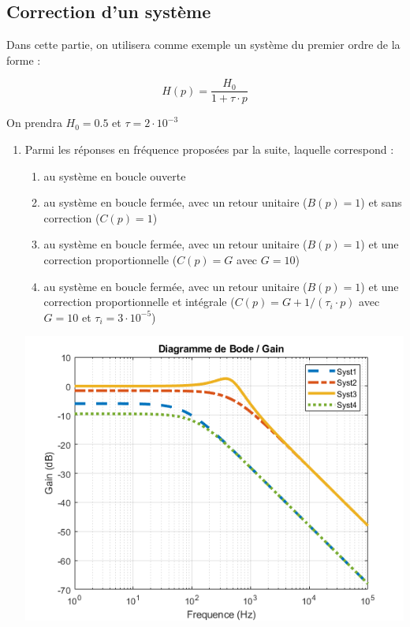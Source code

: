 \subsection*{Correction d'un système}

Dans cette partie, on utilisera comme exemple un système du premier ordre de la forme : 

$$H(p) = \frac{H_0}{1 + \tau \cdot p}$$

On prendra $H_0 = 0.5$ et $\tau = 2 \cdot 10^{-3}$

\begin{enumerate}
	\item Parmi les réponses en fréquence proposées par la suite, laquelle correspond :
\begin{enumerate}
	\item au système en boucle ouverte 
	\item au système en boucle fermée, avec un retour unitaire ($B(p) = 1$) et sans correction ($C(p) = 1$)
	\item au système en boucle fermée, avec un retour unitaire ($B(p) = 1$) et une correction proportionnelle ($C(p) = G$ avec $G = 10$)
	\item au système en boucle fermée, avec un retour unitaire ($B(p) = 1$) et une correction proportionnelle et intégrale ($C(p) = G + 1/(\tau_i \cdot p)$ avec $G = 10$ et $\tau_i = 3 \cdot 10^{-5}$)
\end{enumerate}

\begin{center}
	\includegraphics[width=15cm]{images/TD/sys_boucle_bode.png}
\end{center}


\end{enumerate}
